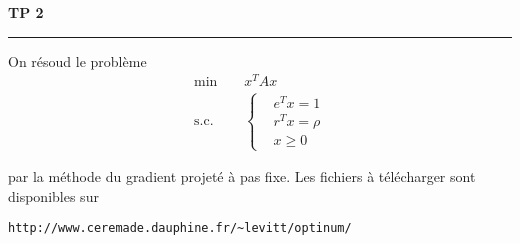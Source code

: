 \documentclass[10pt,a4paper,fleqn]{report}
\begin{document}
\newpage

\begin{center}

\textbf{\huge TP 2}

\smallskip

\rule{10cm}{0.4pt}

\end{center}

On résoud le problème
\begin{align*}
  \text{min} \;\;\;\;&x^{T} A x\\
  \text{s.c.}\;\;\;\;&\begin{cases}
    &e^{T} x = 1\\
  &r^{T} x = \rho\\
  &x \geq 0
  \end{cases}
\end{align*}

par la méthode du gradient projeté à pas fixe. Les fichiers à
télécharger sont disponibles sur

\verb+http://www.ceremade.dauphine.fr/~levitt/optinum/+
\end{document}
